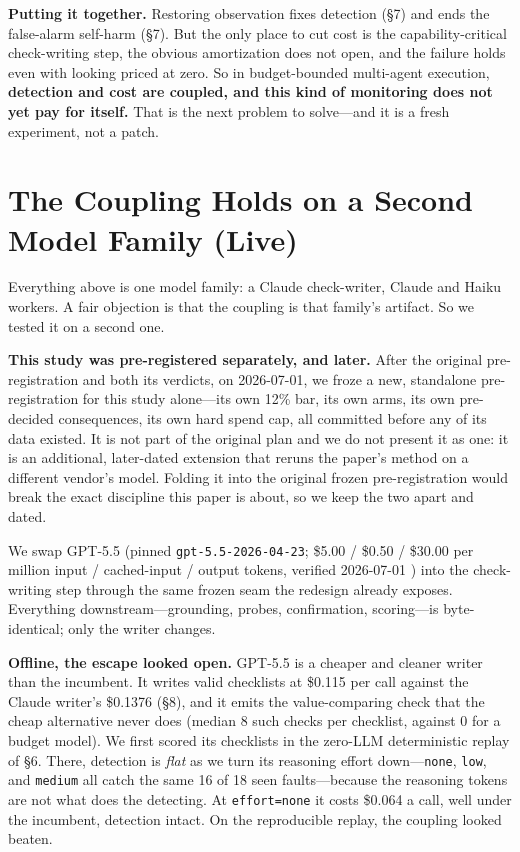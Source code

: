 \documentclass[acmsmall,screen]{acmart}
\begin{document}
\textbf{Putting it together.} Restoring observation fixes detection (\S7) and
ends the false-alarm self-harm (\S7). But the only place to cut cost is the
capability-critical check-writing step, the obvious amortization does not open,
and the failure holds even with looking priced at zero. So in budget-bounded
multi-agent execution, \textbf{detection and cost are coupled, and this kind of
monitoring does not yet pay for itself.} That is the next problem to solve---and
it is a fresh experiment, not a patch.

\section{The Coupling Holds on a Second Model Family (Live)}
Everything above is one model family: a Claude check-writer, Claude and Haiku
workers. A fair objection is that the coupling is that family's artifact. So we
tested it on a second one.

\textbf{This study was pre-registered separately, and later.} After the original
pre-registration and both its verdicts, on 2026-07-01, we froze a new, standalone
pre-registration for this study alone---its own 12\% bar, its own arms, its own
pre-decided consequences, its own hard spend cap, all committed before any of its
data existed. It is not part of the original plan and we do not present it as one:
it is an additional, later-dated extension that reruns the paper's method on a
different vendor's model. Folding it into the original frozen pre-registration
would break the exact discipline this paper is about, so we keep the two apart
and dated.

We swap GPT-5.5 (pinned \texttt{gpt-5.5-2026-04-23}; \$5.00 / \$0.50 / \$30.00 per
million input / cached-input / output tokens, verified 2026-07-01 \cite{ref38})
into the check-writing step through the same frozen seam the redesign already
exposes. Everything downstream---grounding, probes, confirmation, scoring---is
byte-identical; only the writer changes.

\textbf{Offline, the escape looked open.} GPT-5.5 is a cheaper and cleaner writer
than the incumbent. It writes valid checklists at \$0.115 per call against the
Claude writer's \$0.1376 (\S8), and it emits the value-comparing check that the
cheap alternative never does (median 8 such checks per checklist, against 0 for a
budget model). We first scored its checklists in the zero-LLM deterministic
replay of \S6. There, detection is \emph{flat} as we turn its reasoning effort
down---\texttt{none}, \texttt{low}, and \texttt{medium} all catch the same 16 of
18 seen faults---because the reasoning tokens are not what does the detecting. At
\texttt{effort=none} it costs \$0.064 a call, well under the incumbent, detection
intact. On the reproducible replay, the coupling looked beaten.
\end{document}
